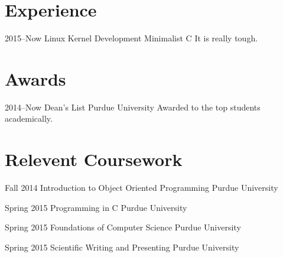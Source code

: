 \documentclass[]{friggeri-cv} %
\begin{document}

\section{Experience}

\begin{entrylist}

\entry
{2015--Now}
{Linux Kernel Development}
{Minimalist C}
{It is really tough.}

\end{entrylist}

\section{Awards}

\begin{entrylist}


\entry
{2014--Now}
{Dean's List}
{Purdue University}
{Awarded to the top students academically.}


\end{entrylist}


\section{Relevent Coursework}

\begin{entrylist}


\entry
{Fall 2014}
{Introduction to Object Oriented Programming}
{Purdue University}


\entry
{Spring 2015}
{Programming in C}
{Purdue University}


\entry
{Spring 2015}
{Foundations of Computer Science}
{Purdue University}


\entry
{Spring 2015}
{Scientific Writing and Presenting}
{Purdue University}


\end{entrylist}
\end{document}
